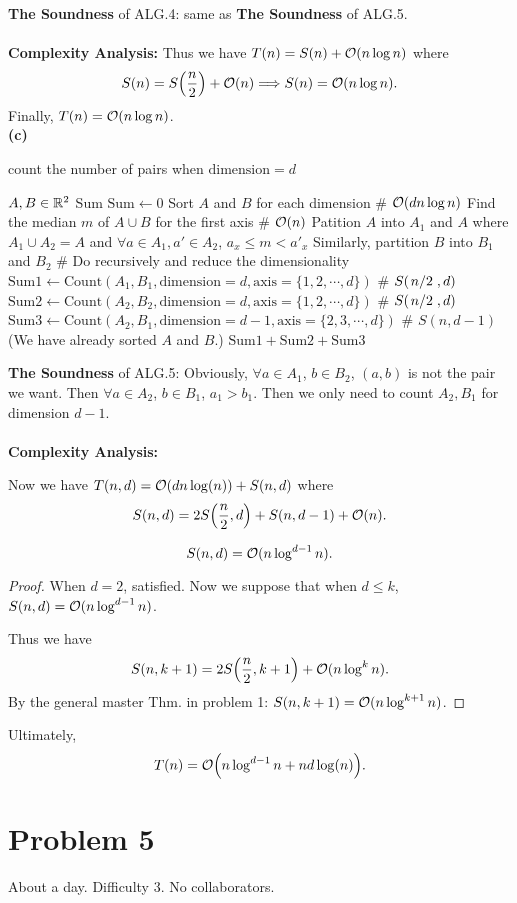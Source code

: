 \documentclass{article}
\begin{document}
\textbf{The Soundness} of ALG.4: same as \textbf{The Soundness} of ALG.5.
\\\\
\textbf{Complexity Analysis:}
Thus we have $T(n)=S(n)+\mathcal{O}(n\log n)$ where
\[
	S(n)=S\qty(\frac{n}{2})+\mathcal{O}(n)\Longrightarrow S(n)=\mathcal{O}(n\log n)
.\]
Finally, $T(n)=\mathcal{O}(n\log n)$.
\\[8pt]
\textbf{(c)}
\begin{algorithm}[H]
	\caption{count the number of pairs when $\mathrm{dimension}=d$}
	\begin{algorithmic}
		\renewcommand{\algorithmicrequire}{\textbf{Input:}}
		\renewcommand{\algorithmicensure}{\textbf{Output:}}
		\REQUIRE $A,B\in\mathbb{R}^2$
		\ENSURE Sum
		\ENDIF
		\STATE $\mathrm{Sum}\gets 0$
		\STATE Sort $A$ and $B$ for each dimension \# $\mathcal{O}(dn\log n)$
		\ENDIF
		\STATE Find the median $m$ of $A\cup B$ for the first axis \# $\mathcal{O}(n)$
		\STATE Patition $A$ into  $A_1$ and $A$ where $A_1\cup A_2=A$ and $\forall a\in A_1,a'\in A_2$, $a_x\le m<a'_x$
		\STATE Similarly, partition $B$ into  $B_1$ and $B_2$
		\STATE \# Do recursively and reduce the dimensionality
		\STATE $\mathrm{Sum1}\gets\mathrm{Count}(A_1,B_1,\mathrm{dimension}=d,\mathrm{axis}=\{1,2, \cdots,d\})$ \# $S(\flatfrac{n}{2},d)$
		\STATE $\mathrm{Sum2}\gets\mathrm{Count}(A_2,B_2,\mathrm{dimension}=d,\mathrm{axis}=\{1,2, \cdots,d\})$ \# $S(\flatfrac{n}{2},d)$
		\STATE $\mathrm{Sum3}\gets\mathrm{Count}(A_2,B_1,\mathrm{dimension}=d-1,\mathrm{axis}=\{2,3, \cdots,d\})$ \# $S(n,d-1)$ (We have already sorted $A$ and $B$.)
		\RETURN $\mathrm{Sum1}+\mathrm{Sum2}+\mathrm{Sum3}$
	\end{algorithmic}
\end{algorithm}
\newpage
\textbf{The Soundness} of ALG.5:
Obviously, $\forall a\in A_1$, $b\in B_2$, $(a,b)$ is not the pair we want. Then $\forall a\in A_2$, $b\in B_1$, $a_1>b_1$. Then we only need to count $A_2,B_1$ for dimension $d-1$.
\\\\
\textbf{Complexity Analysis:}

Now we have $T(n,d)=\mathcal{O}\qty(dn\log(n))+S(n,d)$ where
\[
	S(n,d)=2S\qty(\frac{n}{2},d)+S(n,d-1)+\mathcal{O}(n)
.\] 
\begin{prp}
	\[
		S(n,d)=\mathcal{O}(n\log^{d-1}n)
	.\] 
\end{prp}
\begin{proof}
	When $d=2$, satisfied. Now we suppose that when  $d\le k$, $S(n,d)=\mathcal{O}(n\log^{d-1}n)$.

	Thus we have
	\[
		S(n,k+1)=2S\qty(\frac{n}{2},k+1)+\mathcal{O}(n\log^kn)
	.\]
	By the general master Thm. in problem 1: $S(n,k+1)=\mathcal{O}(n\log^{k+1}n)$.
\end{proof}
Ultimately,
\[
	T(n)=\mathcal{O}\qty(n\log^{d-1}n+nd\log(n))
.\] 

\section*{Problem 5}
About a day. Difficulty 3. No collaborators.
\end{document}
